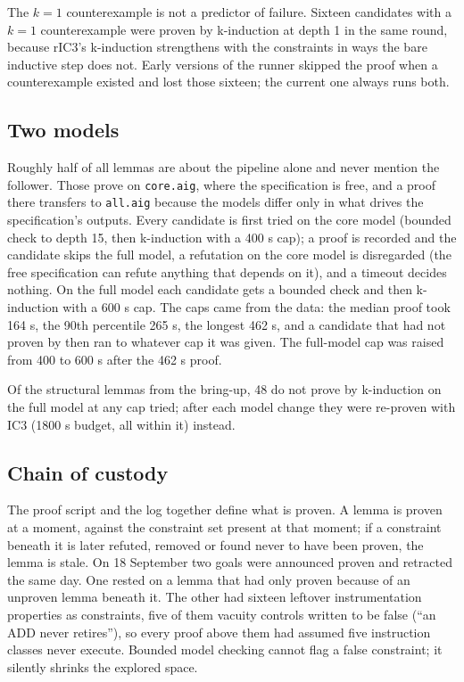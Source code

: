 \documentclass[11pt]{article}
\newcommand{\code}[1]{\texttt{#1}}
\begin{document}
The $k=1$ counterexample is not a predictor of failure. Sixteen candidates with
a $k=1$ counterexample were proven by k-induction at depth 1 in the same round,
because rIC3's k-induction strengthens with the constraints in ways the bare
inductive step does not. Early versions of the runner skipped the proof when a
counterexample existed and lost those sixteen; the current one always runs
both.

\subsection{Two models}
\label{sec:twomodel}

Roughly half of all lemmas are about the pipeline alone and never mention the
follower. Those prove on \code{core.aig}, where the specification is free, and
a proof there transfers to \code{all.aig} because the models differ only in
what drives the specification's outputs. Every candidate is first tried on the
core model (bounded check to depth 15, then k-induction with a 400 s cap); a
proof is recorded and the candidate skips the full model, a refutation on the
core model is disregarded (the free specification can refute anything that
depends on it), and a timeout decides nothing. On the full model each candidate
gets a bounded check and then k-induction with a 600 s cap. The caps came from
the data: the median proof took 164 s, the 90th percentile 265 s, the longest
462 s, and a candidate that had not proven by then ran to whatever cap it was
given. The full-model cap was raised from 400 to 600 s after the 462 s proof.

Of the structural lemmas from the bring-up, 48 do not prove by k-induction on
the full model at any cap tried; after each model change they were re-proven
with IC3 (1800 s budget, all within it) instead.

\subsection{Chain of custody}

The proof script and the log together define what is proven. A lemma is
proven at a moment, against the constraint set present at that moment; if a
constraint beneath it is later refuted, removed or found never to have been
proven, the lemma is stale. On 18 September two goals were announced proven
and retracted the same day. One rested on a lemma that had only proven because
of an unproven lemma beneath it. The other had sixteen leftover
instrumentation properties as constraints, five of them vacuity controls
written to be false (``an ADD never retires''), so every proof above them had
assumed five instruction classes never execute. Bounded model checking cannot
flag a false constraint; it silently shrinks the explored space.
\end{document}
